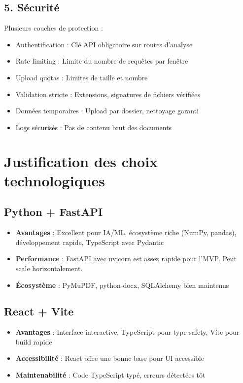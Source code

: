 \documentclass[12pt,a4paper,oneside]{book}
\begin{document}
\subsection{5. Sécurité}

Plusieurs couches de protection :
\begin{itemize}
    \item Authentification : Clé API obligatoire sur routes d'analyse
    \item Rate limiting : Limite du nombre de requêtes par fenêtre
    \item Upload quotas : Limites de taille et nombre
    \item Validation stricte : Extensions, signatures de fichiers vérifiées
    \item Données temporaires : Upload par dossier, nettoyage garanti
    \item Logs sécurisés : Pas de contenu brut des documents
\end{itemize}

\section{Justification des choix technologiques}

\subsection{Python + FastAPI}

\begin{itemize}
    \item \textbf{Avantages} : Excellent pour IA/ML, écosystème riche (NumPy, pandas), développement rapide, TypeScript avec Pydantic
    \item \textbf{Performance} : FastAPI avec uvicorn est assez rapide pour l'MVP. Peut scale horizontalement.
    \item \textbf{Écosystème} : PyMuPDF, python-docx, SQLAlchemy bien maintenus
\end{itemize}

\subsection{React + Vite}

\begin{itemize}
    \item \textbf{Avantages} : Interface interactive, TypeScript pour type safety, Vite pour build rapide
    \item \textbf{Accessibilité} : React offre une bonne base pour UI accessible
    \item \textbf{Maintenabilité} : Code TypeScript typé, erreurs détectées tôt
\end{itemize}
\end{document}
